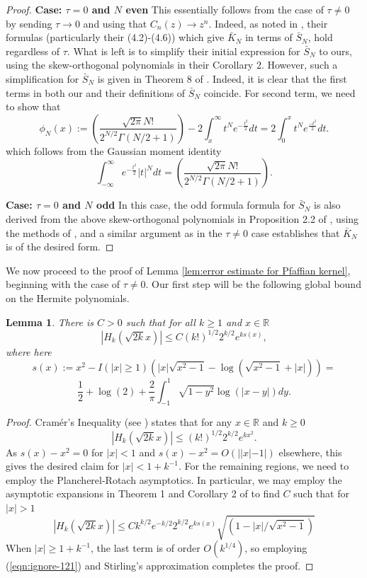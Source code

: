 \documentclass[12pt]{article}
\newcommand{\R}{\mathbb{R}}
\newtheorem{lem}[info]{Lemma}
\numberwithin{info}{section}
\numberwithin{equation}{section}
\renewcommand{\[}{\begin{equation}}
\renewcommand{\]}{\end{equation}}
\newcommand{\sq}{\sqrt}
\newcommand{\<}{\langle}
\renewcommand{\>}{\rangle}
\renewcommand{\sq}{\sqrt}
\begin{document}
\begin{proof}
		\textbf{Case: $\tau=0$ and $N$ even}
		This essentially follows from the case of $\tau\neq 0$ by sending $\tau\to 0$ and using that $C_n(z)\to z^n$. Indeed, as noted in \cite{forrester-elliptic}, their formulas (particularly their (4.2)-(4.6)) which give $\bar{K}_N$ in terms of $\bar{S}_N$, hold regardless of $\tau$. What is left is to simplify their initial expression for $\bar{S}_N$ to ours, using the skew-orthogonal polynomials in their Corollary 2.  However, such a simplification for $\bar{S}_N$ is given in Theorem 8 of \cite{borodin-elliptic}. Indeed, it is clear that the first terms in both our and their definitions of $\bar{S}_N$ coincide. For second term, we need to show that 
		\[\phi_{N}(x):=\left(\frac{\sq{2\pi}N!}{2^{N/2}\Gamma(N/2+1)}\right)-2\int_x^\infty t^{N}e^{-\frac{t^2}{2}} dt=2\int_0^x t^Ne^{\frac{-t^2}{2}}dt.\label{eqn:ignore-2983094823-even}\]
		which follows from the Gaussian moment identity
		\[\int_{-\infty}^{\infty} e^{-\frac{t^2}{2}}|t|^{N} dt=\left(\frac{\sq{2\pi}N!}{2^{N/2}\Gamma(N/2+1)}\right).\label{eqn:ignore-gmi}\]
		
		\textbf{Case: $\tau=0$ and $N$ odd}
		In this case, the odd formula formula for $\bar{S}_N$ is also derived from the above skew-orthogonal polynomials in Proposition 2.2 of \cite{ginibre-odd}, using the methods of \cite{sinclair}, and a similar argument as in the $\tau\neq 0$ case establishes that $\bar{K}_N$ is of the desired form.
	\end{proof}
	
	We now proceed to the proof of Lemma \ref{lem:error estimate for Pfaffian kernel}, beginning with the case of $\tau \neq 0$. Our first step will be the following global bound on the Hermite polynomials.
	
	\begin{lem}
		\label{lem:technical:Hermite upper bound}
		There is $C>0$ such that for all $k\ge 1$ and $x\in \R$
		\[|H_k(\sq{2k}x)|\le
		C(k!)^{1/2}2^{k/2}e^{k s(x)},\]
		where here
		\[s(x):=x^2-I(|x|\ge 1)\left(|x|\sq{x^2-1}-\log(\sq{x^2-1}+|x|)\right)=\]
		\[\frac{1}{2}+\log(2)+\frac{2}{\pi}\int_{-1}^1\sq{1-y^2}\log(|x-y|)dy.\]
	\end{lem}
	\begin{proof}
		Cram\'{e}r's Inequality (see \cite{szego}) states that for any $x\in \R$ and $k\ge 0$
		\[|H_k(\sq{2k}x)|\le (k!)^{1/2}2^{k/2}e^{k x^2}.\]
		As $s(x)-x^2=0$ for $|x|<1$ and $s(x)-x^2=O(||x|-1|)$ elsewhere, this gives the desired claim for $|x|<1+k^{-1}$. For the remaining regions, we need to employ the Plancherel-Rotach asymptotics. In particular, we may employ the asymptotic expansions in Theorem 1 and Corollary 2 of \cite{diego-pr-asym} to find $C$ such that for $|x|>1$
		\[|H_k(\sq{2k}x)|\le Ck^{k/2}e^{-k/2}2^{k/2}e^{ks(x)}\sq{\left(1-|x|/\sq{x^2-1}\right)}\label{eqn:ignore-121}\]
		When $|x|\ge 1+k^{-1}$, the last term is of order $O(k^{1/4})$, so employing (\ref{eqn:ignore-121}) and Stirling's approximation completes the proof.
	\end{proof}
	
\end{document}

